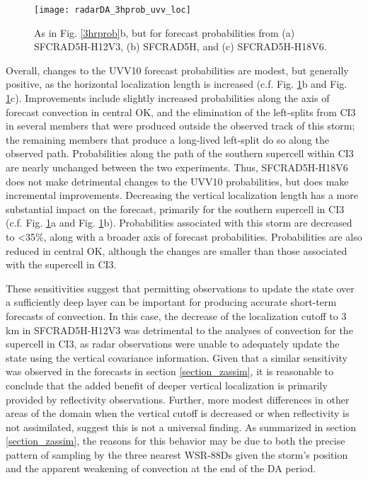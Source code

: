 \begin{figure}
\centering
\texttt{[image: radarDA\_3hprob\_uvv\_loc]}
\caption{As in Fig. \ref{3hrprob}b, but for forecast probabilities from (a) SFCRAD5H-H12V3, (b) SFCRAD5H, and (c) SFCRAD5H-H18V6.}
\label{probuvvloc}
\end{figure}

Overall, changes to the UVV10 forecast probabilities are modest, but generally positive, as the horizontal localization length is increased (c.f. Fig. \ref{probuvvloc}b and Fig. \ref{probuvvloc}c). Improvements include slightly increased probabilities along the axis of forecast convection in central OK, and the elimination of the left-splits from CI3 in several members that were produced outside the observed track of this storm; the remaining members that produce a long-lived left-split do so along the observed path. Probabilities along the path of the southern supercell within CI3 are nearly unchanged between the two experiments. Thus, SFCRAD5H-H18V6 does not make detrimental changes to the UVV10 probabilities, but does make incremental improvements. Decreasing the vertical localization length has a more substantial impact on the forecast, primarily for the southern supercell in CI3 (c.f. Fig. \ref{probuvvloc}a and Fig. \ref{probuvvloc}b). Probabilities associated with this storm are decreased to \textless 35\%, along with a broader axis of forecast probabilities. Probabilities are also reduced in central OK, although the changes are smaller than those associated with the supercell in CI3.

These sensitivities suggest that permitting observations to update the state over a sufficiently deep layer can be important for producing accurate short-term forecasts of convection. In this case, the decrease of the localization cutoff to 3 km in SFCRAD5H-H12V3 was detrimental to the analyses of convection for the supercell in CI3, as radar observations were unable to adequately update the state using the vertical covariance information. Given that a similar sensitivity was observed in the forecasts in section \ref{section_zassim}, it is reasonable to conclude that the added benefit of deeper vertical localization is primarily provided by reflectivity observations. Further, more modest differences in other areas of the domain when the vertical cutoff is decreased or when reflectivity is not assimilated, suggest this is not a universal finding. As summarized in section \ref{section_zassim}, the reasons for this behavior may be due to both the precise pattern of sampling by the three nearest WSR-88Ds given the storm's position and the apparent weakening of convection at the end of the DA period. 

